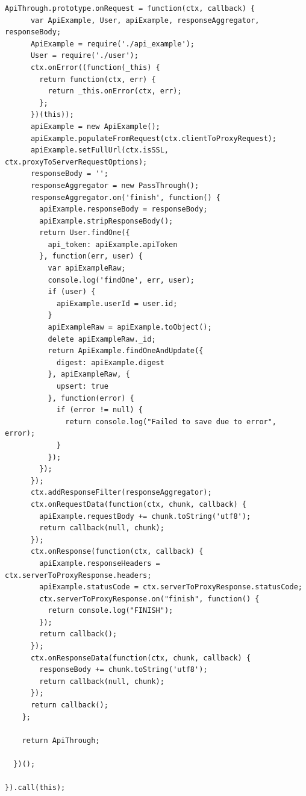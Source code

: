 \begin{lstlisting}[caption=lib/api\_through.js]
    ApiThrough.prototype.onRequest = function(ctx, callback) {
      var ApiExample, User, apiExample, responseAggregator, responseBody;
      ApiExample = require('./api_example');
      User = require('./user');
      ctx.onError((function(_this) {
        return function(ctx, err) {
          return _this.onError(ctx, err);
        };
      })(this));
      apiExample = new ApiExample();
      apiExample.populateFromRequest(ctx.clientToProxyRequest);
      apiExample.setFullUrl(ctx.isSSL, ctx.proxyToServerRequestOptions);
      responseBody = '';
      responseAggregator = new PassThrough();
      responseAggregator.on('finish', function() {
        apiExample.responseBody = responseBody;
        apiExample.stripResponseBody();
        return User.findOne({
          api_token: apiExample.apiToken
        }, function(err, user) {
          var apiExampleRaw;
          console.log('findOne', err, user);
          if (user) {
            apiExample.userId = user.id;
          }
          apiExampleRaw = apiExample.toObject();
          delete apiExampleRaw._id;
          return ApiExample.findOneAndUpdate({
            digest: apiExample.digest
          }, apiExampleRaw, {
            upsert: true
          }, function(error) {
            if (error != null) {
              return console.log("Failed to save due to error", error);
            }
          });
        });
      });
      ctx.addResponseFilter(responseAggregator);
      ctx.onRequestData(function(ctx, chunk, callback) {
        apiExample.requestBody += chunk.toString('utf8');
        return callback(null, chunk);
      });
      ctx.onResponse(function(ctx, callback) {
        apiExample.responseHeaders = ctx.serverToProxyResponse.headers;
        apiExample.statusCode = ctx.serverToProxyResponse.statusCode;
        ctx.serverToProxyResponse.on("finish", function() {
          return console.log("FINISH");
        });
        return callback();
      });
      ctx.onResponseData(function(ctx, chunk, callback) {
        responseBody += chunk.toString('utf8');
        return callback(null, chunk);
      });
      return callback();
    };

    return ApiThrough;

  })();

}).call(this);

\end{lstlisting}


